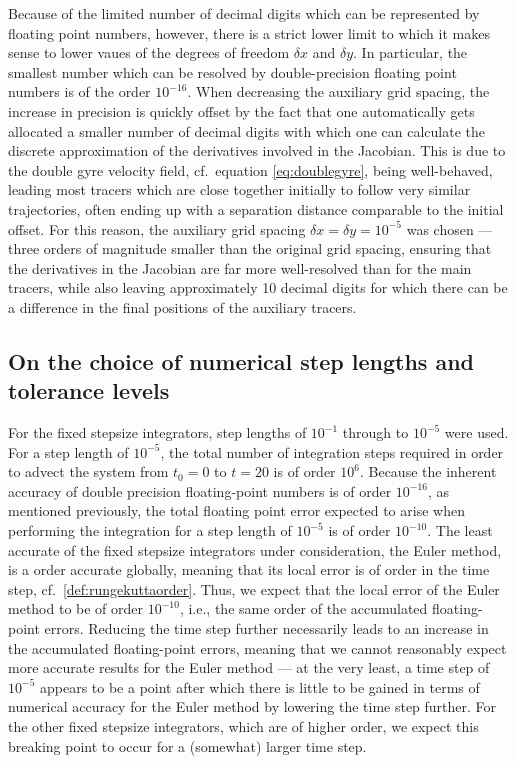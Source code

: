 

Because of the limited number of decimal digits which can be represented by
floating point numbers, however, there is a strict lower limit to which it makes
sense to lower vaues of the degrees of freedom $\delta{x}$ and $\delta{y}$. In
particular, the smallest number which can be resolved by double-precision
floating point numbers is of the order $10^{-16}$. When decreasing the auxiliary
grid spacing, the increase in precision is quickly offset by the fact that
one automatically gets allocated a smaller number of decimal digits with
which one can calculate the discrete approximation of the derivatives involved
in the Jacobian. This is due to the double gyre velocity field, cf.\
equation \eqref{eq:doublegyre}, being well-behaved, leading most tracers which
are close together initially to follow very similar trajectories, often
ending up with a separation distance comparable to the initial offset. For this
reason, the auxiliary grid spacing $\delta{x}=\delta{y}=10^{-5}$ was chosen
--- three orders of magnitude smaller than the original grid spacing, ensuring
that the derivatives in the Jacobian are far more well-resolved than for the
main tracers, while also leaving approximately 10 decimal digits for which
there can be a difference in the final positions of the auxiliary tracers.

\subsection{On the choice of numerical step lengths and tolerance levels}
\label{sub:on_the_choice_of_numerical_step_lengths_and_tolerance_levels}

For the fixed stepsize integrators, step lengths of $10^{-1}$ through to
$10^{-5}$ were used. For a step length of $10^{-5}$, the total number of
integration steps required in order to advect the system from $t_{0}=0$ to
$t=20$ is of order $10^{6}$. Because the inherent accuracy of double precision
floating-point numbers is of order $10^{-16}$, as mentioned previously, the
total floating point error expected to arise when performing the integration
for a step length of $10^{-5}$ is of order $10^{-10}$. The least accurate of
the fixed stepsize integrators under consideration, the Euler method, is a
\nth{1} order accurate globally, meaning that its local error is of \nth{2}
order in the time step, cf.\
\cref{def:rungekuttaorder}. Thus, we expect that the local error of the Euler
method to be of order $10^{-10}$, i.e., the same order of the accumulated
floating-point errors. Reducing the time step further necessarily leads to
an increase in the accumulated floating-point errors, meaning that we cannot
reasonably expect more accurate results for the Euler method --- at the very
least, a time step of $10^{-5}$ appears to be a point after which there is
little to be gained in terms of numerical accuracy for the Euler method by
lowering the time step further. For the other fixed stepsize integrators, which
are of higher order, we expect this breaking point to occur for a (somewhat)
larger time step.

